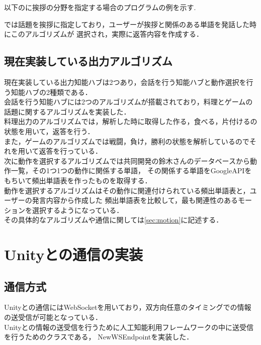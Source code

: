以下のに挨拶の分野を指定する場合のプログラムの例を示す. 
\\

では話題を挨拶に指定しており，ユーザーが挨拶と関係のある単語を発話した時にこのアルゴリズムが
選択され，実際に返答内容を作成する．
\\
\subsection{現在実装している出力アルゴリズム}\label{sec:back}
現在実装している出力知能ハブは2つあり，会話を行う知能ハブと動作選択を行う知能ハブの2種類である．
\\
会話を行う知能ハブには2つのアルゴリズムが搭載されており，料理とゲームの話題に関するアルゴリズムを実装した．
\\
料理出力のアルゴリズムでは，解析した時に取得した作る，食べる，片付けるの状態を用いて，返答を行う．
\\
また，ゲームのアルゴリズムでは戦闘，負け，勝利の状態を解析しているのでそれを用いて返答を行っている．
\\

次に動作を選択するアルゴリズムでは共同開発の鈴木さんのデータベースから動作一覧，その1つ1つの動作に関係する単語，
その関係する単語をGoogleAPIをもちいて頻出単語表を作ったものを取得する．
\\

動作を選択するアルゴリズムはその動作に関連付けられている頻出単語表と，ユーザーの発言内容から作成した
頻出単語表を比較して，最も関連性のあるモーションを選択するようになっている．\\

その具体的なアルゴリズムや通信に関しては\ref{sec:motion}に記述する．\\






\section{Unityとの通信の実装}
\subsection{通信方式}
Unityとの通信にはWebSocketを用いており，双方向任意のタイミングでの情報の送受信が可能となっている．\\
Unityとの情報の送受信を行うために人工知能利用フレームワークの中に送受信を行うためのクラスである，
NewWSEndpointを実装した．\\

